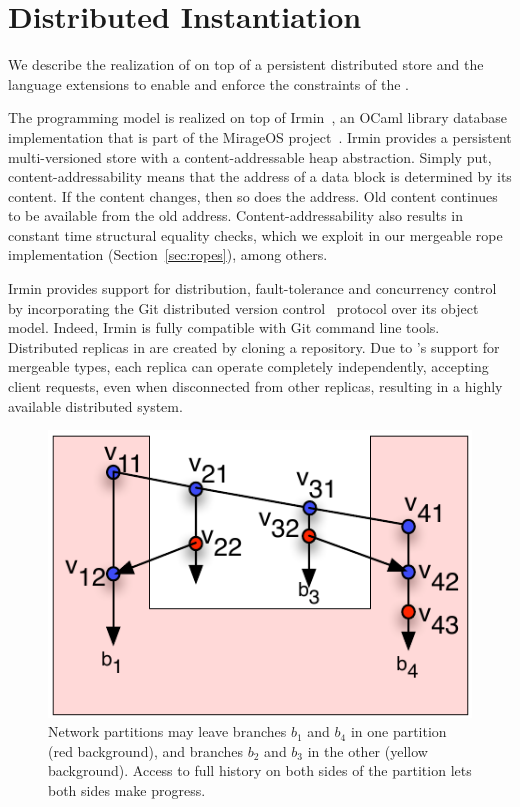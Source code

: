 \section{Distributed Instantiation}
\label{sec:implementation}

We describe the realization of \name on top of a persistent
distributed store and the language extensions to enable and enforce
the constraints of the \name.

The \name programming model is realized on top of Irmin~\cite{irmin},
an OCaml library database implementation that is part of the MirageOS
project~\cite{mirage}. Irmin provides a persistent multi-versioned
store with a content-addressable heap abstraction. Simply put,
content-addressability means that the address of a data block is
determined by its content. If the content changes, then so does the
address. Old content continues to be available from the old
address. Content-addressability also results in constant time
structural equality checks, which we exploit in our mergeable rope
implementation (Section~\ref{sec:ropes}), among others.

Irmin provides support for distribution, fault-tolerance and
concurrency control by incorporating the Git distributed version
control~\cite{git} protocol over its object model. Indeed, Irmin is
fully compatible with Git command line tools. Distributed replicas in
\name are created by cloning a \name repository. Due to \name's
support for mergeable types, each replica can operate completely
independently, accepting client requests, even when disconnected from
other replicas, resulting in a highly available distributed system.

\begin{figure}
	\begin{center}
	\includegraphics[scale=0.8]{Figures/partitions}
	\end{center}
  \caption{Network partitions may leave branches $b_1$ and $b_4$ in
  one partition (red background), and branches $b_2$ and $b_3$ in the
  other (yellow background). Access to full history on both sides of
  the partition lets both sides make progress.}
	\label{fig:partitions}
\end{figure}

